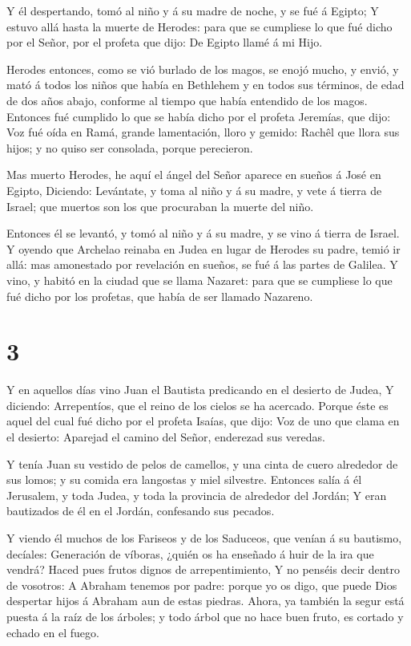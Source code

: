  Y él despertando, tomó al niño y á su madre de noche, y se
fué á Egipto;  Y estuvo allá hasta la muerte de Herodes:
para que se cumpliese lo que fué dicho por el Señor, por el profeta que
dijo: De Egipto llamé á mi Hijo.

 Herodes entonces, como se vió burlado de los magos, se
enojó mucho, y envió, y mató á todos los niños que había en Bethlehem y
en todos sus términos, de edad de dos años abajo, conforme al tiempo que
había entendido de los magos.  Entonces fué cumplido lo que
se había dicho por el profeta Jeremías, que dijo:  Voz fué
oída en Ramá, grande lamentación, lloro y gemido: Rachêl que llora sus
hijos; y no quiso ser consolada, porque perecieron.

 Mas muerto Herodes, he aquí el ángel del Señor aparece en
sueños á José en Egipto,  Diciendo: Levántate, y toma al
niño y á su madre, y vete á tierra de Israel; que muertos son los que
procuraban la muerte del niño.

 Entonces él se levantó, y tomó al niño y á su madre, y se
vino á tierra de Israel.  Y oyendo que Archelao reinaba en
Judea en lugar de Herodes su padre, temió ir allá: mas amonestado por
revelación en sueños, se fué á las partes de Galilea.  Y
vino, y habitó en la ciudad que se llama Nazaret: para que se cumpliese
lo que fué dicho por los profetas, que había de ser llamado Nazareno.

\hypertarget{section-2}{%
\section{3}\label{section-2}}

 Y en aquellos días vino Juan el Bautista predicando en el
desierto de Judea,  Y diciendo: Arrepentíos, que el reino de
los cielos se ha acercado.  Porque éste es aquel del cual
fué dicho por el profeta Isaías, que dijo: Voz de uno que clama en el
desierto: Aparejad el camino del Señor, enderezad sus veredas.

 Y tenía Juan su vestido de pelos de camellos, y una cinta
de cuero alrededor de sus lomos; y su comida era langostas y miel
silvestre.  Entonces salía á él Jerusalem, y toda Judea, y
toda la provincia de alrededor del Jordán;  Y eran
bautizados de él en el Jordán, confesando sus pecados.

 Y viendo él muchos de los Fariseos y de los Saduceos, que
venían á su bautismo, decíales: Generación de víboras, ¿quién os ha
enseñado á huir de la ira que vendrá?  Haced pues frutos
dignos de arrepentimiento,  Y no penséis decir dentro de
vosotros: A Abraham tenemos por padre: porque yo os digo, que puede Dios
despertar hijos á Abraham aun de estas piedras.  Ahora, ya
también la segur está puesta á la raíz de los árboles; y todo árbol que
no hace buen fruto, es cortado y echado en el fuego.

